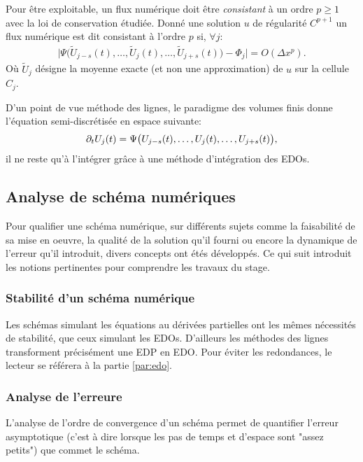     \begin{definition}
        Pour être exploitable, un flux numérique doit être \textit{consistant} à un ordre $p\geq 1$ avec la loi de conservation étudiée.
        Donné une solution $u$ de régularité $C^{p+1}$ un flux numérique est dit consistant à l'ordre $p$ si, $\forall j$:
        \begin{align}
            \vert \Psi \bigl( \tilde U_{j-s}(t) , \ldots ,\tilde  U_j(t), \ldots ,  \tilde U_{j+s}(t)\bigr) -  \Phi_j \vert = O(\Delta x^p).
        \end{align}
        Où $\tilde U_j$ désigne la moyenne exacte (et non une approximation) de $u$ sur la cellule $C_j$.
    \end{definition}
    D'un point de vue méthode des lignes, le paradigme des volumes finis donne l'équation semi-discrétisée en espace suivante:
    \begin{align}
        \partial_t U_j(t) = \Psi \bigl( U_{j-s}(t) , \ldots , U_j(t), \ldots ,  U_{j+s}(t)\bigr),
    \end{align}
    il ne reste qu'à l'intégrer grâce à une méthode d'intégration des EDOs.


\subsection{Analyse de schéma numériques}
    Pour qualifier une schéma numérique, sur différents sujets comme 
    la faisabilité de sa mise en oeuvre, la qualité de la solution qu'il fourni ou encore la dynamique de l'erreur qu'il introduit, 
    divers concepts ont étés développés. Ce qui suit introduit les notions pertinentes pour comprendre les travaux du stage. 

    \subsubsection{Stabilité d'un schéma numérique}
        Les schémas simulant les équations au dérivées partielles ont les mêmes nécessités de stabilité, que ceux simulant les EDOs. 
        D'ailleurs les méthodes des lignes transforment précisément une EDP en EDO. 
        Pour éviter les redondances, le lecteur se référera à la partie \ref{par:edo}.
    \subsubsection{Analyse de l'erreure}
        L'analyse de l'ordre de convergence d'un schéma permet de quantifier l'erreur asymptotique 
        (c'est à dire lorsque les pas de temps et d'espace sont "assez petits") que commet le schéma.
